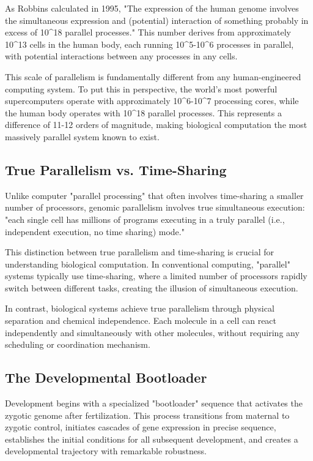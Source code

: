 \documentclass[11pt]{article}
\begin{document}
As Robbins calculated in 1995, "The expression of the human genome involves the simultaneous expression and (potential) interaction of something probably in excess of 10^18 parallel processes." This number derives from approximately 10^13 cells in the human body, each running 10^5-10^6 processes in parallel, with potential interactions between any processes in any cells.

This scale of parallelism is fundamentally different from any human-engineered computing system. To put this in perspective, the world's most powerful supercomputers operate with approximately 10^6-10^7 processing cores, while the human body operates with 10^18 parallel processes. This represents a difference of 11-12 orders of magnitude, making biological computation the most massively parallel system known to exist.

\subsection{True Parallelism vs. Time-Sharing}

Unlike computer "parallel processing" that often involves time-sharing a smaller number of processors, genomic parallelism involves true simultaneous execution: "each single cell has millions of programs executing in a truly parallel (i.e., independent execution, no time sharing) mode."

This distinction between true parallelism and time-sharing is crucial for understanding biological computation. In conventional computing, "parallel" systems typically use time-sharing, where a limited number of processors rapidly switch between different tasks, creating the illusion of simultaneous execution.

In contrast, biological systems achieve true parallelism through physical separation and chemical independence. Each molecule in a cell can react independently and simultaneously with other molecules, without requiring any scheduling or coordination mechanism.

\subsection{The Developmental Bootloader}

Development begins with a specialized "bootloader" sequence that activates the zygotic genome after fertilization. This process transitions from maternal to zygotic control, initiates cascades of gene expression in precise sequence, establishes the initial conditions for all subsequent development, and creates a developmental trajectory with remarkable robustness.
\end{document}
